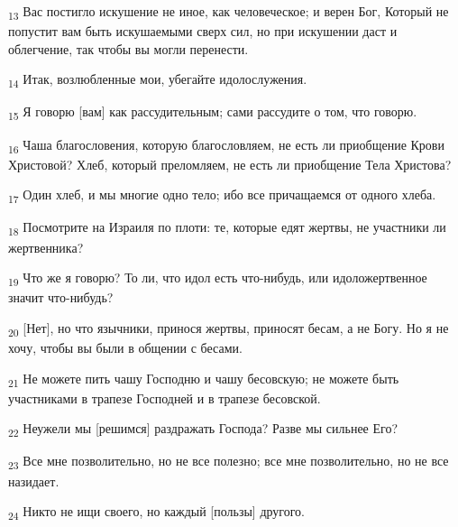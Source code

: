 \begin{tcolorbox}
\textsubscript{13} Вас постигло искушение не иное, как человеческое; и верен Бог, Который не попустит вам быть искушаемыми сверх сил, но при искушении даст и облегчение, так чтобы вы могли перенести.
\end{tcolorbox}
\begin{tcolorbox}
\textsubscript{14} Итак, возлюбленные мои, убегайте идолослужения.
\end{tcolorbox}
\begin{tcolorbox}
\textsubscript{15} Я говорю [вам] как рассудительным; сами рассудите о том, что говорю.
\end{tcolorbox}
\begin{tcolorbox}
\textsubscript{16} Чаша благословения, которую благословляем, не есть ли приобщение Крови Христовой? Хлеб, который преломляем, не есть ли приобщение Тела Христова?
\end{tcolorbox}
\begin{tcolorbox}
\textsubscript{17} Один хлеб, и мы многие одно тело; ибо все причащаемся от одного хлеба.
\end{tcolorbox}
\begin{tcolorbox}
\textsubscript{18} Посмотрите на Израиля по плоти: те, которые едят жертвы, не участники ли жертвенника?
\end{tcolorbox}
\begin{tcolorbox}
\textsubscript{19} Что же я говорю? То ли, что идол есть что-нибудь, или идоложертвенное значит что-нибудь?
\end{tcolorbox}
\begin{tcolorbox}
\textsubscript{20} [Нет], но что язычники, принося жертвы, приносят бесам, а не Богу. Но я не хочу, чтобы вы были в общении с бесами.
\end{tcolorbox}
\begin{tcolorbox}
\textsubscript{21} Не можете пить чашу Господню и чашу бесовскую; не можете быть участниками в трапезе Господней и в трапезе бесовской.
\end{tcolorbox}
\begin{tcolorbox}
\textsubscript{22} Неужели мы [решимся] раздражать Господа? Разве мы сильнее Его?
\end{tcolorbox}
\begin{tcolorbox}
\textsubscript{23} Все мне позволительно, но не все полезно; все мне позволительно, но не все назидает.
\end{tcolorbox}
\begin{tcolorbox}
\textsubscript{24} Никто не ищи своего, но каждый [пользы] другого.
\end{tcolorbox}
